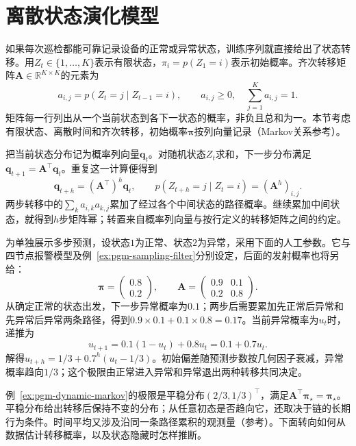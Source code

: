\section{离散状态演化模型}
\label{sec:pgm-dynamic-discrete}

如果每次巡检都能可靠记录设备的正常或异常状态，训练序列就直接给出了状态转移。用$Z_t\in\{1,\ldots,K\}$表示有限状态，$\pi_i=p(Z_1=i)$表示初始概率。齐次转移矩阵$\bm{A}\in\mathbb{R}^{K\times K}$的元素为
\[
  a_{i,j}=p(Z_t=j\mid Z_{t-1}=i),\qquad
  a_{i,j}\geq0,\quad \sum_{j=1}^{K}a_{i,j}=1.
\]
矩阵每一行列出从一个当前状态到各下一状态的概率，非负且总和为一。本节考虑有限状态、离散时间和齐次转移，初始概率$\bm\pi$按列向量记录（Markov关系参考）。

把当前状态分布记为概率列向量$\bm{q}_t$。对随机状态$Z_t$求和，下一步分布满足$\bm{q}_{t+1}=\bm{A}^{\top}\bm{q}_t$。重复这一计算便得到
\begin{equation}
  \bm{q}_{t+h}=(\bm{A}^{\top})^h\bm{q}_t,\qquad
  p(Z_{t+h}=j\mid Z_t=i)=(\bm{A}^h)_{i,j}.
  \label{eq:pgm-dynamic-markov-prediction}
\end{equation}
两步转移中的$\sum_k a_{i,k}a_{k,j}$累加了经过各个中间状态的路径概率。继续累加中间状态，就得到$h$步矩阵幂；转置来自概率列向量与按行定义的转移矩阵之间的约定。

\begin{example}[两状态设备的多步预测]
  \label{ex:pgm-dynamic-markov}
  为单独展示多步预测，设状态$1$为正常、状态$2$为异常，采用下面的人工参数。它与四节点报警模型及例~\ref{ex:pgm-sampling-filter}分别设定，后面的发射概率也将另给：
  \[
    \bm{\pi}=\begin{pmatrix}0.8\\0.2\end{pmatrix},\qquad
    \bm{A}=
    \begin{pmatrix}0.9&0.1\\0.2&0.8\end{pmatrix}.
  \]
  从确定正常的状态出发，下一步异常概率为$0.1$；两步后需要累加先正常后异常和先异常后异常两条路径，得到$0.9\times0.1+0.1\times0.8=0.17$。当前异常概率为$u_t$时，递推为
  \[
    u_{t+1}=0.1(1-u_t)+0.8u_t=0.1+0.7u_t.
  \]
  解得$u_{t+h}=1/3+0.7^h(u_t-1/3)$。初始偏差随预测步数按几何因子衰减，异常概率趋向$1/3$；这个极限由正常进入异常和异常退出两种转移共同决定。
\end{example}

例~\ref{ex:pgm-dynamic-markov}的极限是平稳分布$(2/3,1/3)^\top$，满足$\bm A^\top\bm\pi_\star=\bm\pi_\star$。平稳分布给出转移后保持不变的分布；从任意初态是否趋向它，还取决于链的长期行为条件。时间平均又涉及沿同一条路径累积的观测量（参考）。下面转向如何从数据估计转移概率，以及状态隐藏时怎样推断。

